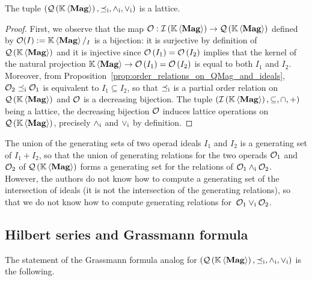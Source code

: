 \begin{Theorem} \label{thm:lattice_structure_of_QMag}
    The tuple $\LatQMag$ is a lattice.
\end{Theorem}
\begin{proof}
    First, we observe that the map $\Oca:\IMag\to\QMag$ defined by
    $\Oca(I) := \KMag/_I$ is a bijection: it is surjective by definition
    of $\QMag$ and it is injective since
    \begin{math}
        \Oca\left(I_1\right) = \Oca\left(I_2\right)
    \end{math}
    implies that the kernel of the natural projection
    \begin{math}
        \KMag\to\Oca\left(I_1\right) = \Oca\left(I_2\right)
    \end{math}
    is equal to both $I_1$ and $I_2$. Moreover, from
    Proposition~\ref{prop:order_relations_on_QMag_and_ideals},
    $\Oca_2\OrdQMag\Oca_1$ is equivalent to $I_1\subseteq I_2$, so that
    $\OrdQMag$ is a partial order relation on $\QMag$ and $\Oca$ is a
    decreasing bijection. The tuple
    $\left(\IMag,\subseteq,\cap,+\right)$ being a lattice, the
    decreasing bijection $\Oca$ induces lattice operations on $\QMag$,
    precisely $\InfQMag$ and $\SupQMag$ by definition.
\end{proof}
\medbreak

The union of the generating sets of two operad ideals $I_1$ and $I_2$
is a generating set of $I_1+I_2$, so that the union of generating
relations for the two operads $\Oca_1$ and $\Oca_2$ of $\QMag$ forms a
generating set for the relations of $\Oca_1\InfQMag\Oca_2$. However, the
authors do not know how to compute a generating set of the intersection
of ideals (it is not the intersection of the generating relations), so
that we do not know how to compute generating relations
for~$\Oca_1\SupQMag\Oca_2$.
\medbreak

\subsection{Hilbert series and Grassmann formula}
The statement of the Grassmann formula analog for $\LatQMag$ is the
following.
\medbreak

